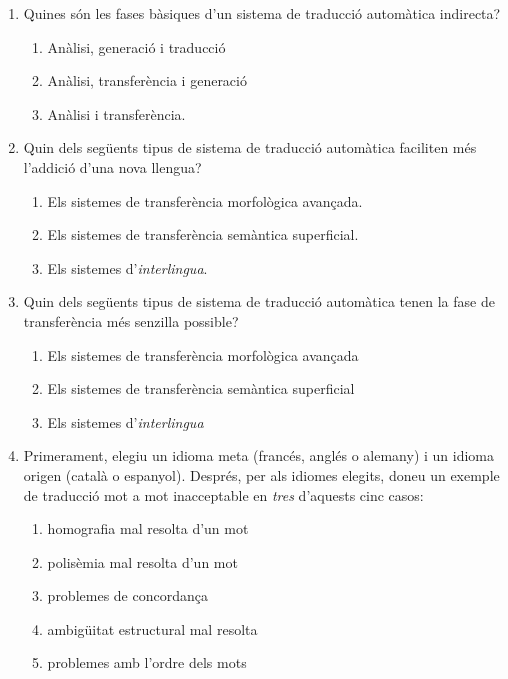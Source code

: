 \begin{enumerate}
\item Quines són les fases bàsiques d'un sistema de traducció
 automàtica indirecta?
 \begin{enumerate}
 \item Anàlisi, generació i traducció
 \item Anàlisi, transferència i generació
  \item Anàlisi i transferència.
 \end{enumerate}

\item Quin dels següents tipus de sistema de traducció
automàtica faciliten més l'addició d'una nova 
llengua?
\begin{enumerate}
\item Els sistemes de transferència morfològica avançada.
\item Els sistemes de transferència semàntica superficial.
\item Els sistemes d'\emph{interlingua}.
\end{enumerate}


\item Quin dels següents tipus de sistema de traducció
automàtica tenen la fase de transferència més senzilla possible?
\begin{enumerate}
\item Els sistemes de transferència morfològica avançada
\item Els sistemes de transferència semàntica superficial
\item Els sistemes d'\emph{interlingua}
\end{enumerate}

    \item Primerament, elegiu un idioma meta (francés, anglés o
      alemany) i un idioma origen (català o espanyol). Després, per
      als idiomes elegits, doneu un exemple de traducció mot a mot
      inacceptable en \emph{tres} d'aquests cinc casos:
      \begin{enumerate}
      \item homografia mal resolta d'un mot
      \item polisèmia mal resolta d'un mot
      \item problemes de concordança
      \item ambigüitat estructural mal resolta
      \item problemes amb l'ordre dels mots
      \end{enumerate}
      

\end{enumerate}
